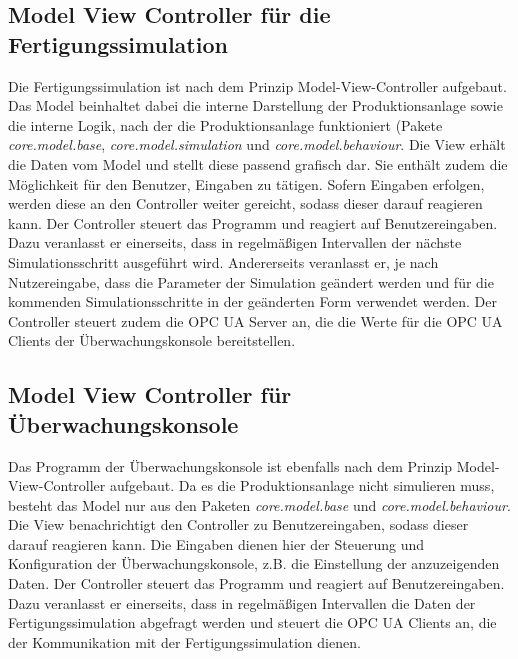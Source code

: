 \documentclass[parskip=full]{scrartcl}
\begin{document}
\subsection{Model View Controller f\"ur die Fertigungssimulation}
\label{mvc}
Die Fertigungssimulation ist nach dem Prinzip Model-View-Controller aufgebaut.
Das Model beinhaltet dabei die interne Darstellung der Produktionsanlage sowie die interne Logik, nach der die Produktionsanlage funktioniert
(Pakete \emph{core.model.base}, \emph{core.model.simulation} und \emph{core.model.behaviour}.
Die View erh\"alt die Daten vom Model und stellt diese passend grafisch dar. Sie enth\"alt zudem die M\"oglichkeit f\"ur den Benutzer, Eingaben zu
t\"atigen. Sofern Eingaben erfolgen, werden diese an den Controller weiter gereicht, sodass dieser darauf reagieren kann.
Der Controller steuert das Programm und reagiert auf Benutzereingaben. Dazu veranlasst er einerseits, dass in regelm\"a{\ss}igen Intervallen der
n\"achste Simulationsschritt ausgef\"uhrt wird. Andererseits veranlasst er, je nach Nutzereingabe, dass die Parameter der Simulation ge\"andert werden
und f\"ur die kommenden Simulationsschritte in der ge\"anderten Form verwendet werden. Der Controller steuert zudem die OPC UA Server an, die die
Werte f\"ur die OPC UA Clients der \"Uberwachungskonsole bereitstellen.

\subsection{Model View Controller f\"ur \"Uberwachungskonsole}
Das Programm der \"Uberwachungskonsole ist ebenfalls nach dem Prinzip Model-View-Controller aufgebaut.
Da es die Produktionsanlage nicht simulieren muss, besteht das Model nur aus den Paketen \emph{core.model.base} und \emph{core.model.behaviour}.
Die View benachrichtigt den Controller zu Benutzereingaben, sodass dieser darauf reagieren kann. Die Eingaben dienen hier der Steuerung und Konfiguration
der \"Uberwachungskonsole, z.B. die Einstellung der anzuzeigenden Daten.
Der Controller steuert das Programm und reagiert auf Benutzereingaben. Dazu veranlasst er einerseits, dass in regelm\"a{\ss}igen Intervallen die Daten der
Fertigungssimulation abgefragt werden und steuert die OPC UA Clients an, die der Kommunikation mit der Fertigungssimulation dienen.

\pagebreak
\end{document}
